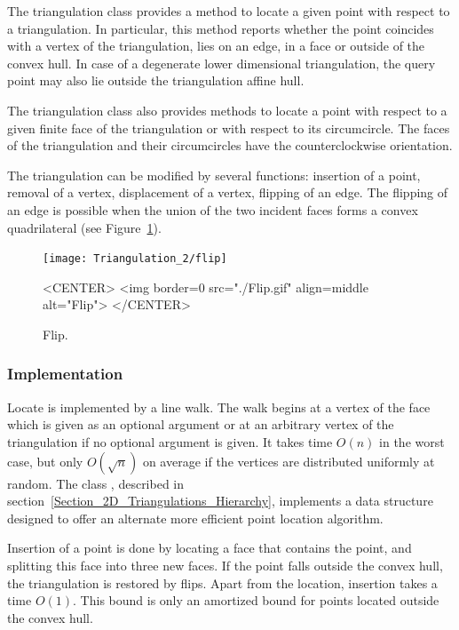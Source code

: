 The triangulation class  provides a method to locate
a given point with respect to a triangulation.
In particular, this method reports whether the point
coincides with a vertex of the triangulation, lies on an edge,
in a face or outside of the convex hull. In case of a degenerate 
lower dimensional triangulation, the query point may also lie
outside the triangulation affine hull.

The triangulation class also provides
methods to locate a point with respect to
a given  finite face of the triangulation or with respect to its
circumcircle.
The faces of the triangulation and their circumcircles 
have the  counterclockwise orientation.

The triangulation can be modified by several functions:
insertion of a point, removal of a vertex, displacement of a vertex,
flipping  of an edge. The flipping of an edge
is possible when the union of the two incident faces
forms  a convex quadrilateral (see Figure~\ref{2D_Triangulation_fig_flip_bis}). 

\begin{figure}
\begin{ccTexOnly}
\begin{center}
\texttt{[image: Triangulation\_2/flip]}
\end{center}
\end{ccTexOnly} 
\begin{ccHtmlOnly}
<CENTER>
<img border=0 src="./Flip.gif" align=middle alt="Flip">
</CENTER>
\end{ccHtmlOnly} 

\caption{Flip. \label{2D_Triangulation_fig_flip_bis}}
\end{figure}


\subsubsection{Implementation}

Locate is implemented by a line walk. The walk
begins  at  a vertex of the face which
is given
as an optional argument  or at an arbitrary vertex of the triangulation
 if no optional argument is given. It takes
time $O(n)$ in the worst case, but only $O(\sqrt{n})$
on average if the vertices are distributed uniformly at random.
The class ,
described in section~\ref{Section_2D_Triangulations_Hierarchy}, 
implements a data structure  designed to
offer an alternate  more efficient point location algorithm.

Insertion of a point is done by locating a face that contains the
point, and splitting this face into three new faces.
If the point falls outside the convex hull, the triangulation
 is restored by flips.  Apart from the location, insertion takes a
time $O(1)$. This bound is only an amortized bound
for points located outside the convex hull.

